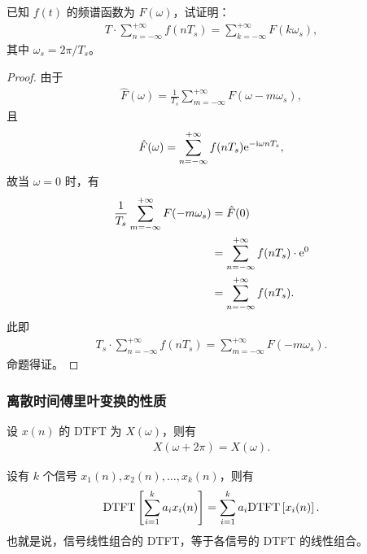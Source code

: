 \begin{exercise}
    已知 $f(t)$ 的频谱函数为 $F(\omega)$，试证明：
    \begin{align*}
        T \cdot \sum_{n = -\infty}^{+\infty}f(nT_s) = \sum_{k = -\infty}^{+\infty}F(k\omega_s),
    \end{align*}
    其中 $\omega_s = 2\pi / T_s$。
\end{exercise}

\begin{proof}
    由于
    \begin{align*}
        \hat{F}(\omega) = \frac{1}{T_s}\sum_{m = -\infty}^{+\infty}F(\omega - m\omega_s),
    \end{align*}
    且
    \begin{align*}
        \hat{F}(\omega) = \sum_{n = -\infty}^{+\infty}f(nT_s)\mathrm{e}^{-\mathrm{i}\omega nT_s},
    \end{align*}
    故当 $\omega = 0$ 时，有
    \begin{align*}
        \frac{1}{T_s}\sum_{m = -\infty}^{+\infty}F(-m\omega_s) & = \hat{F}(0) \\
        & = \sum_{n = -\infty}^{+\infty}f(nT_s) \cdot \mathrm{e}^{0} \\
        & = \sum_{n = -\infty}^{+\infty}f(nT_s).
    \end{align*}
    此即
    \begin{align*}
        T_s \cdot \sum_{n = -\infty}^{+\infty}f(nT_s) = \sum_{m = -\infty}^{+\infty}F(-m\omega_s).
    \end{align*}
    命题得证。
\end{proof}

\subsubsection{离散时间傅里叶变换的性质}

\begin{property}
    设 $x(n)$ 的 DTFT 为 $X(\omega)$，则有
    \begin{align*}
        X(\omega + 2\pi) = X(\omega).
    \end{align*}
\end{property}

\begin{property}
    设有 $k$ 个信号 $x_1(n), x_2(n), \ldots, x_k(n)$，则有
    \begin{align*}
        \mathrm{DTFT}\left[\sum_{i = 1}^{k}a_i x_i(n)\right] = \sum_{i = 1}^{k}a_i \mathrm{DTFT}\left[x_i(n)\right].
    \end{align*}
    也就是说，信号线性组合的 DTFT，等于各信号的 DTFT 的线性组合。
\end{property}

